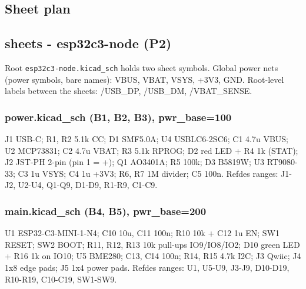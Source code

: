 \documentclass[11pt]{article}
\begin{document}
\subsection*{Sheet plan}
\subsection*{sheets - esp32c3-node (P2)}
Root \texttt{esp32c3-node.kicad\_sch} holds two sheet symbols. Global power nets (power symbols, bare names): VBUS, VBAT, VSYS, +3V3, GND. Root-level labels between the sheets: /USB\_DP, /USB\_DM, /VBAT\_SENSE.

\subsubsection*{power.kicad\_sch (B1, B2, B3), pwr\_base=100}
J1 USB-C; R1, R2 5.1k CC; D1 SMF5.0A; U4 USBLC6-2SC6; C1 4.7u VBUS; U2 MCP73831; C2 4.7u VBAT; R3 5.1k RPROG; D2 red LED + R4 1k (STAT); J2 JST-PH 2-pin (pin 1 = +); Q1 AO3401A; R5 100k; D3 B5819W; U3 RT9080-33; C3 1u VSYS; C4 1u +3V3; R6, R7 1M divider; C5 100n. Refdes ranges: J1-J2, U2-U4, Q1-Q9, D1-D9, R1-R9, C1-C9.

\subsubsection*{main.kicad\_sch (B4, B5), pwr\_base=200}
U1 ESP32-C3-MINI-1-N4; C10 10u, C11 100n; R10 10k + C12 1u EN; SW1 RESET; SW2 BOOT; R11, R12, R13 10k pull-ups IO9/IO8/IO2; D10 green LED + R16 1k on IO10; U5 BME280; C13, C14 100n; R14, R15 4.7k I2C; J3 Qwiic; J4 1x8 edge pads; J5 1x4 power pads. Refdes ranges: U1, U5-U9, J3-J9, D10-D19, R10-R19, C10-C19, SW1-SW9.
\end{document}
